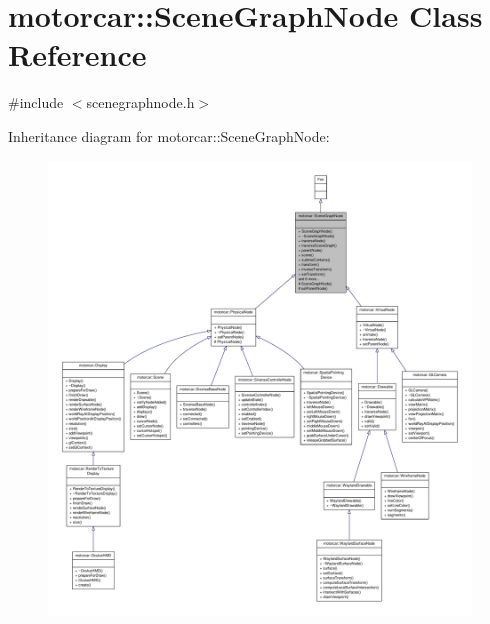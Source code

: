 \hypertarget{classmotorcar_1_1SceneGraphNode}{\section{motorcar\-:\-:Scene\-Graph\-Node Class Reference}
\label{classmotorcar_1_1SceneGraphNode}
}


{\ttfamily \#include $<$scenegraphnode.\-h$>$}



Inheritance diagram for motorcar\-:\-:Scene\-Graph\-Node\-:
\nopagebreak
\begin{figure}[H]
\begin{center}
\leavevmode
\includegraphics[width=350pt]{classmotorcar_1_1SceneGraphNode__inherit__graph}
\end{center}
\end{figure}


